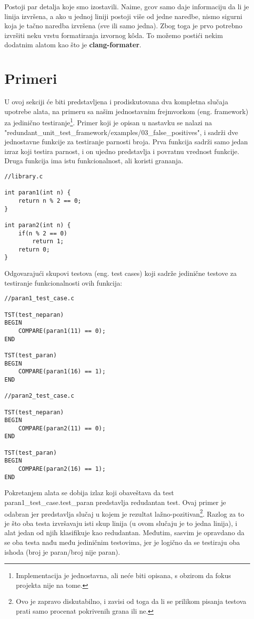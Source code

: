 \documentclass[a4paper]{article}
\begin{document}
Postoji par detalja koje smo izostavili. Naime, gcov samo daje informaciju da li je linija izvršena, a ako u jednoj liniji postoji više od jedne naredbe, nismo sigurni koja je tačno naredba izvršena (sve ili samo jedna). Zbog toga je prvo potrebno izvršiti neku vrstu formatiranja izvornog kôda. To možemo postići nekim dodatnim alatom kao što je \textbf{clang-formater}.

\section{Primeri}
\label{sec:examples}
U ovoj sekciji će biti predstavljena i prodiskutovana dva kompletna slučaja upotrebe alata, na primeru sa našim jednostavnim frejmvorkom (eng. framework) za jedinično testiranje\footnote{Implementacija je jednostavna, ali neće biti opisana, s obzirom da fokus projekta nije na tome.}. Primer koji je opisan u nastavku se nalazi na "redundant\_unit\_test\_framework/examples/03\_false\_positives", i sadrži dve jednostavne funkcije za testiranje parnosti broja. Prva funkcija sadrži samo jedan izraz koji testira parnost, i on ujedno predstavlja i povratnu vrednost funkcije. Druga funkcija ima istu funkcionalnost, ali koristi grananja.

\begin{lstlisting}
//library.c

int paran1(int n) {
	return n % 2 == 0;
}

int paran2(int n) {
	if(n % 2 == 0)
		return 1;
	return 0;
}
\end{lstlisting}

Odgovarajući skupovi testova (eng. test cases) koji sadrže jedinične testove za testiranje funkcionalnosti ovih funkcija:

\begin{lstlisting}
//paran1_test_case.c

TST(test_neparan)
BEGIN
	COMPARE(paran1(11) == 0);
END

TST(test_paran)
BEGIN
	COMPARE(paran1(16) == 1);
END

//paran2_test_case.c

TST(test_neparan)
BEGIN
	COMPARE(paran2(11) == 0);
END

TST(test_paran)
BEGIN
	COMPARE(paran2(16) == 1);
END

\end{lstlisting}

Pokretanjem alata se dobija izlaz koji obaveštava da test paran1\_test\_case.test\_paran predstavlja redudantan test. Ovaj primer je odabran jer predstavlja slučaj u kojem je rezultat lažno-pozitivan\footnote{Ovo je zapravo diskutabilno, i zavisi od toga da li se prilikom pisanja testova prati samo procenat pokrivenih grana ili ne.}. Razlog za to je što oba testa izvršavaju isti skup linija (u ovom slučaju je to jedna linija), i alat jedan od njih klasifikuje kao redudantan. Međutim, sasvim je opravdano da se oba testa nađu među jediničnim testovima, jer je logično da se testiraju oba ishoda (broj je paran/broj nije paran).
\end{document}
